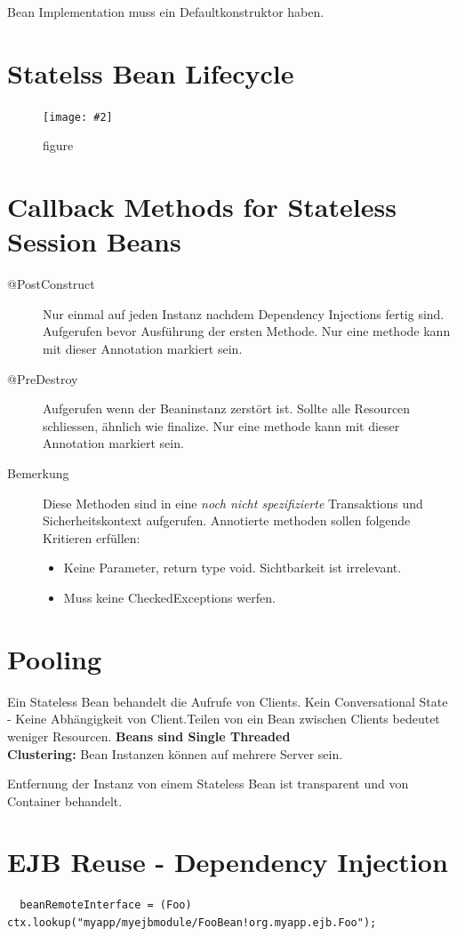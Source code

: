 \documentclass[a4paper,10pt]{scrreprt}
\newcommand{\pic}[2][figure]{\begin{figure}[h]
 \centering
 \texttt{[image: \#2]}
 \caption{#1}
\end{figure}
}
\begin{document}
\begin{framed}
 Bean Implementation muss ein Defaultkonstruktor haben. 
\end{framed}

\section{Statelss Bean Lifecycle}
\pic{slsbl.png}

\section{Callback Methods for Stateless Session Beans}
\begin{description}
 \item[@PostConstruct] Nur einmal auf jeden Instanz nachdem Dependency Injections fertig sind. Aufgerufen bevor Ausführung der ersten Methode. Nur eine methode kann mit dieser Annotation markiert sein.
 \item[@PreDestroy] Aufgerufen wenn der Beaninstanz zerstört ist. Sollte alle Resourcen schliessen, ähnlich wie finalize. Nur eine methode kann mit dieser Annotation markiert sein.
 \item[Bemerkung] Diese Methoden sind in eine \textit{noch nicht spezifizierte} Transaktions und Sicherheitskontext aufgerufen. Annotierte methoden sollen folgende Kritieren erfüllen: 
 \begin{itemize}
  \item Keine Parameter, return type void. Sichtbarkeit ist irrelevant.
  \item Muss keine CheckedExceptions werfen.
 \end{itemize}

\end{description}

\section{Pooling}
Ein Stateless Bean behandelt die Aufrufe von Clients. Kein Conversational State - Keine Abhängigkeit von 
Client.Teilen von ein Bean zwischen Clients bedeutet weniger Resourcen. \textbf{Beans sind Single Threaded}\\
\textbf{Clustering:} Bean Instanzen können auf mehrere Server sein.

Entfernung der Instanz von einem Stateless Bean ist transparent und von Container behandelt.


\section{EJB Reuse - Dependency Injection}
\begin{framed}
\begin{verbatim}
  beanRemoteInterface = (Foo) ctx.lookup("myapp/myejbmodule/FooBean!org.myapp.ejb.Foo");
\end{verbatim}


\end{framed}
\end{document}
